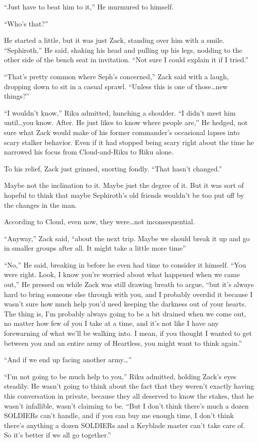 ``Just have to beat him to it,'' He murmured to himself.

``Who's that?''

He started a little, but it was just Zack, standing over him with a smile. ``Sephiroth,'' He said, shaking his head and pulling up his legs, nodding to the other side of the bench seat in invitation. ``Not sure I could explain it if I tried.''

``That's pretty common where Seph's concerned,'' Zack said with a laugh, dropping down to sit in a casual sprawl. ``Unless this is one of those\ldots new things?''

``I wouldn't know,'' Riku admitted, hunching a shoulder. ``I didn't meet him until\ldots you know. After. He just likes to know where people are,'' He hedged, not sure what Zack would make of his former commander's occasional lapses into scary stalker behavior. Even if it had stopped being scary right about the time he narrowed his focus from Cloud-and-Riku to Riku alone.

To his relief, Zack just grinned, snorting fondly. ``That hasn't changed.''

Maybe not the inclination to it. Maybe just the degree of it. But it was sort of hopeful to think that maybe Sephiroth's old friends wouldn't be too put off by the changes in the man.

According to Cloud, even now, they were\ldots not inconsequential.

``Anyway,'' Zack said, ``about the next trip. Maybe we should break it up and go in smaller groups after all. It might take a little more time\textemdash ''

``No,'' He said, breaking in before he even had time to consider it himself. ``You were right. Look, I know you're worried about what happened when we came out,'' He pressed on while Zack was still drawing breath to argue, ``but it's always hard to bring someone else through with you, and I probably overdid it because I wasn't sure how much help you'd need keeping the darkness out of your hearts. The thing is, I'm probably always going to be a bit drained when we come out, no matter how few of you I take at a time, and it's not like I have any forewarning of what we'll be walking into. I mean, if you thought I wanted to get between you and an entire army of Heartless, you might want to think again.''

``And if we end up facing another army\ldots''

``I'm not going to be much help to you,'' Riku admitted, holding Zack's eyes steadily. He wasn't going to think about the fact that they weren't exactly having this conversation in private, because they all deserved to know the stakes, that he wasn't infallible, wasn't claiming to be. ``But I don't think there's much a dozen SOLDIERs can't handle, and if you can buy me enough time, I don't think there's anything a dozen SOLDIERs and a Keyblade master can't take care of. So it's better if we all go together.''

